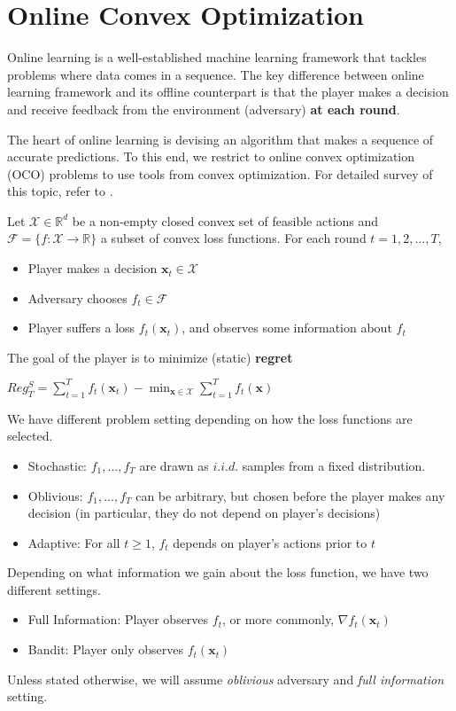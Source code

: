 \documentclass[12pt, a4paper]{report}
\begin{document}
\section{Online Convex Optimization}
Online learning is a well-established machine learning framework that tackles problems where data comes in a sequence. 
The key difference between online learning framework and its offline counterpart is that the player makes a decision and receive feedback from the environment (adversary) \textbf{at each round}.

The heart of online learning is devising an algorithm that makes a sequence of accurate predictions. To this end, we restrict to online convex optimization (OCO) problems to use tools from convex optimization. For detailed survey of this topic, refer to \cite{Orabona2019OnlineLearning, ShalevShwartz2007OnlineLT}.

\begin{defn}
Let $\mathcal{X} \in \mathbb{R}^d$ be a non-empty closed convex set of feasible actions and $\mathcal{F} = \{f : \mathcal{X} \rightarrow \mathbb{R} \}$ a subset of convex loss functions. For each round $t=1,2,...,T$, 
\begin{itemize}
    \item Player makes a decision $\mathbf{x}_t \in \mathcal{X}$
    \item Adversary chooses $f_t \in \mathcal{F}$
    \item Player suffers a loss $f_t(\mathbf{x}_t)$, and observes some information about $f_t$
\end{itemize}
The goal of the player is to minimize (static) \textbf{regret}
\begin{center}
    $\displaystyle Reg_T^{S} = \sum_{t=1}^{T} f_t(\mathbf{x}_t) - \min_{\mathbf{x} \in \mathcal{X}} \sum_{t=1}^{T} f_t(\mathbf{x})$
\end{center}
\end{defn}
We have different problem setting depending on how the loss functions are selected.
\begin{itemize}
    \item Stochastic: $f_1, \dots, f_T$ are drawn as $i.i.d.$ samples from a fixed distribution.
    \item Oblivious: $f_1, \dots, f_T$ can be arbitrary, but chosen before the player makes any decision (in particular, they do not depend on player's decisions)
    \item Adaptive: For all $t \geq 1$, $f_t$ depends on player's actions prior to $t$ 
\end{itemize}
Depending on what information we gain about the loss function, we have two different settings.
\begin{itemize}
    \item Full Information: Player observes $f_t$, or more commonly, $\nabla f_t(\mathbf{x}_t)$
    \item Bandit: Player only observes $f_t(\mathbf{x}_t)$
\end{itemize}
Unless stated otherwise, we will assume \textit{oblivious} adversary and \textit{full information} setting. 
\end{document}

